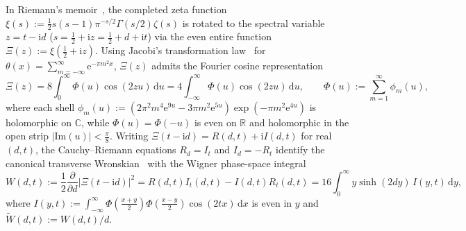 \documentclass[11pt,reqno]{amsart}
\theoremstyle{definition}
\theoremstyle{remark}
\numberwithin{equation}{section}
\newcommand{\R}{\mathbb{R}}
\newcommand{\C}{\mathbb{C}}
\newcommand{\dd}{\mathrm{d}}
\newcommand{\ii}{\mathrm{i}}
\newcommand{\ee}{\mathrm{e}}
\newcommand{\Ima}{\mathrm{Im}}
\begin{document}
In Riemann's memoir~\cite{riemann1859}, the completed zeta function $\xi(s) := \frac{1}{2}s(s-1)\pi^{-s/2}\Gamma(s/2)\zeta(s)$ is rotated to the spectral variable $z = t - \ii d$ ($s = \frac{1}{2} + \ii z = \frac{1}{2} + d + \ii t$) via the even entire function $\Xi(z) := \xi(\frac{1}{2} + \ii z)$. Using Jacobi's transformation law~\cite{jacobi1829} for $\theta(x) = \sum_{m=-\infty}^{\infty} \ee^{-\pi m^2 x}$, $\Xi(z)$ admits the Fourier cosine representation~\cite{polya1926,titchmarsh1986}
\begin{equation}\label{eq:Xi_jacobi_intro}
\Xi(z) = 8\int_0^{\infty} \Phi(u)\cos(2zu)\,\dd u = 4\int_{-\infty}^{\infty} \Phi(u)\cos(2zu)\,\dd u, \qquad \Phi(u) := \sum_{m=1}^{\infty} \phi_m(u),
\end{equation}
where each shell $\phi_m(u) := (2\pi^2 m^4 \ee^{9u} - 3\pi m^2 \ee^{5u})\exp(-\pi m^2 \ee^{4u})$ is holomorphic on $\C$, while $\Phi(u) = \Phi(-u)$ is even on $\R$ and holomorphic in the open strip $\lvert\Ima(u)\rvert < \frac{\pi}{8}$. Writing $\Xi(t - \ii d) = R(d,t) + \ii I(d,t)$ for real $(d,t)$, the Cauchy--Riemann equations $R_d = I_t$ and $I_d = -R_t$ identify the canonical transverse Wronskian~\cite{speiser1934,lagarias1999,hinkkanen1997,csordas1986} with the Wigner phase-space integral~\cite{wigner1932,hudson1974}
\begin{equation}\label{eq:W_canonical_intro}
\boxed{W(d,t) := \frac{1}{2}\frac{\partial}{\partial d}\bigl\lvert\Xi(t - \ii d)\bigr\rvert^2 = R(d,t)I_t(d,t) - I(d,t)R_t(d,t) = 16\int_0^{\infty} y\sinh(2dy)\,I(y,t)\,\dd y,}
\end{equation}
where $I(y,t) := \int_{-\infty}^{\infty} \Phi(\frac{x+y}{2})\Phi(\frac{x-y}{2})\cos(2tx)\,\dd x$ is even in $y$ and $\widetilde{W}(d,t) := W(d,t)/d$.
\end{document}
